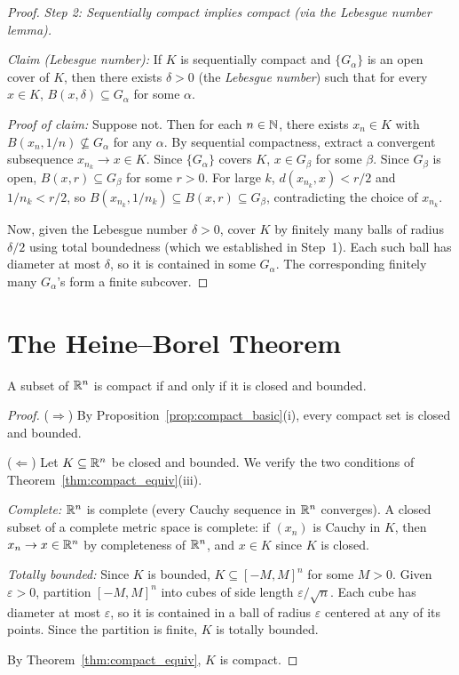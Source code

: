 \documentclass[11pt,a4paper]{article}
\begin{document}
\begin{proof}
\emph{Step 2: Sequentially compact implies compact (via the Lebesgue number
lemma).}

\emph{Claim (Lebesgue number):} If $K$ is sequentially compact and
$\{G_\alpha\}$ is an open cover of $K$, then there exists $\delta > 0$ (the
\emph{Lebesgue number}) such that for every $x \in K$,
$B(x, \delta) \subseteq G_\alpha$ for some $\alpha$.

\emph{Proof of claim:} Suppose not. Then for each $n \in \mathbb{N}$, there exists
$x_n \in K$ with $B(x_n, 1/n) \not\subseteq G_\alpha$ for any $\alpha$. By
sequential compactness, extract a convergent subsequence
$x_{n_k} \to x \in K$. Since $\{G_\alpha\}$ covers $K$,
$x \in G_\beta$ for some $\beta$. Since $G_\beta$ is open,
$B(x, r) \subseteq G_\beta$ for some $r > 0$. For large $k$,
$d(x_{n_k}, x) < r/2$ and $1/n_k < r/2$, so
$B(x_{n_k}, 1/n_k) \subseteq B(x, r) \subseteq G_\beta$, contradicting the
choice of $x_{n_k}$.

Now, given the Lebesgue number $\delta > 0$, cover $K$ by finitely many balls
of radius $\delta/2$ using total boundedness (which we established in
Step~1). Each such ball has diameter at most $\delta$, so it is contained in
some $G_\alpha$. The corresponding finitely many $G_\alpha$'s form a finite
subcover.
\end{proof}


\section{The Heine--Borel Theorem}
\label{sec:heine_borel}

\begin{corollary}
\label{cor:heine_borel}
A subset of $\mathbb{R}^n$ is compact if and only if it is closed and bounded.
\end{corollary}

\begin{proof}
($\Rightarrow$) By Proposition~\ref{prop:compact_basic}(i), every compact
set is closed and bounded.

($\Leftarrow$) Let $K \subseteq \mathbb{R}^n$ be closed and bounded. We verify
the two conditions of Theorem~\ref{thm:compact_equiv}(iii).

\emph{Complete:} $\mathbb{R}^n$ is complete (every Cauchy sequence in $\mathbb{R}^n$
converges). A closed subset of a complete metric space is complete: if
$(x_n)$ is Cauchy in $K$, then $x_n \to x \in \mathbb{R}^n$ by completeness of
$\mathbb{R}^n$, and $x \in K$ since $K$ is closed.

\emph{Totally bounded:} Since $K$ is bounded, $K \subseteq [-M, M]^n$ for
some $M > 0$. Given $\varepsilon > 0$, partition $[-M, M]^n$ into cubes of
side length $\varepsilon / \sqrt{n}$. Each cube has diameter at most
$\varepsilon$, so it is contained in a ball of radius $\varepsilon$ centered
at any of its points. Since the partition is finite, $K$ is totally bounded.

By Theorem~\ref{thm:compact_equiv}, $K$ is compact.
\end{proof}
\end{document}
